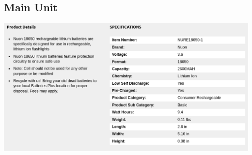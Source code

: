 \documentclass[12pt]{article}
\begin{document}
\subsection{Main Unit}


\includegraphics[width=\textwidth]{../Appendix/Figures/Main-Unit/ 5-May-2023-13-05.png}











\end{document}
